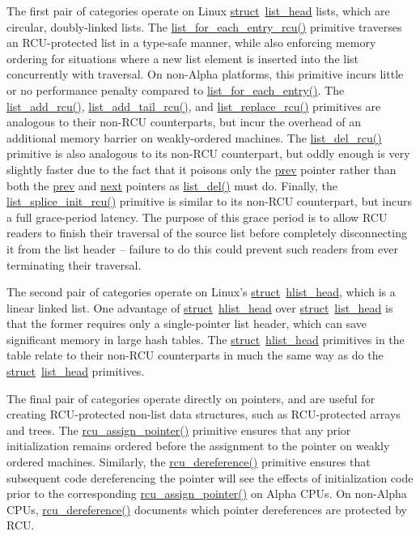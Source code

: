 The first pair of categories operate on Linux
\url{struct}~\url{list_head} lists, which are circular, doubly-linked
lists.
The \url{list_for_each_entry_rcu()} primitive traverses an
RCU-protected list in a type-safe manner, while also enforcing
memory ordering for situations where a new list element is inserted
into the list concurrently with traversal.
On non-Alpha platforms, this primitive incurs little or no performance
penalty compared to \url{list_for_each_entry()}.
The \url{list_add_rcu()}, \url{list_add_tail_rcu()},
and \url{list_replace_rcu()} primitives are analogous to
their non-RCU counterparts, but incur the overhead of an additional
memory barrier on weakly-ordered machines.
The \url{list_del_rcu()} primitive is also analogous to its
non-RCU counterpart, but oddly enough is very slightly faster due to the
fact that it poisons only the \url{prev} pointer rather than
both the \url{prev} and \url{next} pointers as
\url{list_del()} must do.
Finally, the \url{list_splice_init_rcu()} primitive is similar
to its non-RCU counterpart, but incurs a full grace-period latency.
The purpose of this grace period is to allow RCU readers to finish
their traversal of the source list before completely disconnecting
it from the list header -- failure to do this could prevent such
readers from ever terminating their traversal.

\QuickQuizEnd

The second pair of categories operate on Linux's
\url{struct}~\url{hlist_head}, which is a linear linked list.
One advantage of \url{struct}~\url{hlist_head} over
\url{struct}~\url{list_head} is that the former requires only
a single-pointer list header, which can save significant memory in
large hash tables.
The \url{struct}~\url{hlist_head} primitives in the table
relate to their non-RCU counterparts in much the same way as do the
\url{struct}~\url{list_head} primitives.

The final pair of categories operate directly on pointers, and
are useful for creating RCU-protected non-list data structures,
such as RCU-protected arrays and trees.
The \url{rcu_assign_pointer()} primitive ensures that any
prior initialization remains ordered before the assignment to the
pointer on weakly ordered machines.
Similarly, the \url{rcu_dereference()} primitive ensures that subsequent
code dereferencing the pointer will see the effects of initialization code
prior to the corresponding \url{rcu_assign_pointer()} on
Alpha CPUs.
On non-Alpha CPUs, \url{rcu_dereference()} documents which pointer
dereferences are protected by RCU.

